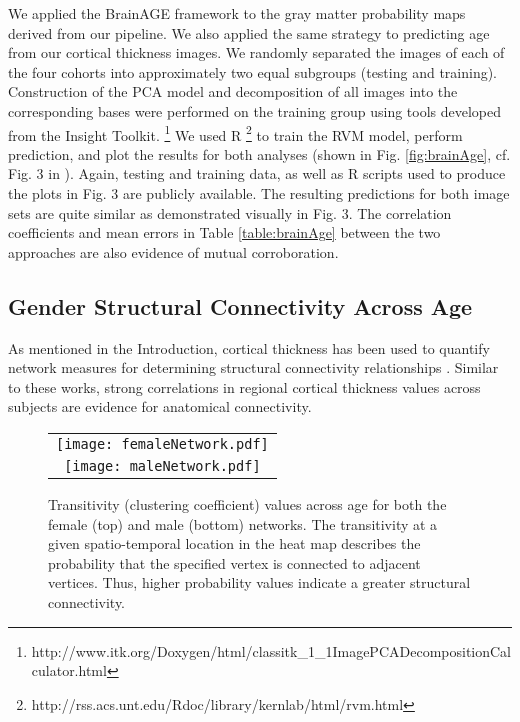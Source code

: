 We applied the BrainAGE framework to the gray matter probability maps derived
from our pipeline.  We also applied the same strategy to predicting age from 
our cortical thickness images.  We randomly separated the images of each of the 
four cohorts into approximately two equal subgroups (testing and training).
Construction of the PCA model and decomposition of all images into the corresponding 
bases were performed on the training group using tools developed from the Insight Toolkit.%
\footnote{
http://www.itk.org/Doxygen/html/classitk\_1\_1ImagePCADecompositionCalculator.html  
}
We used R%
\footnote{
http://rss.acs.unt.edu/Rdoc/library/kernlab/html/rvm.html
} 
to train the RVM model, perform prediction, and plot the results for both
analyses (shown in Fig. \ref{fig:brainAge}, cf. Fig. 3 in \cite{franke2010}).
Again, testing and training data, as well as R scripts used to produce the 
plots in Fig. 3 are publicly available.  
The resulting predictions for both image sets are quite similar as demonstrated 
visually in Fig. 3.  The correlation coefficients and mean errors in Table 
\ref{table:brainAge} between the
two approaches are also evidence of mutual corroboration.

\subsection{Gender Structural Connectivity Across Age}
As mentioned in the Introduction, cortical thickness has
been used to quantify network measures for determining
structural connectivity relationships \citep{he2007,chen2008,he2008}.
Similar to these works, strong correlations in regional cortical 
thickness values across subjects are evidence for anatomical
connectivity.


\begin{figure*}
  \centering
  \begin{tabular}{c}
  \texttt{[image: femaleNetwork.pdf]} \\
  \texttt{[image: maleNetwork.pdf]}
  \end{tabular}
  \caption{Transitivity (clustering coefficient) values across age for both the female (top)
  and male (bottom) networks.  The transitivity at a given spatio-temporal
  location in the heat map describes the probability that the specified 
  vertex is connected to adjacent vertices.  Thus, higher probability values indicate a
  greater structural connectivity.
  }
  \label{fig:network}
\end{figure*}

